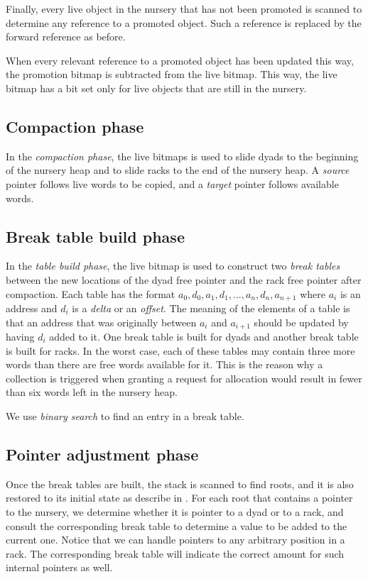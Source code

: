 Finally, every live object in the nursery that has not been promoted
is scanned to determine any reference to a promoted object.  Such a
reference is replaced by the forward reference as before.

When every relevant reference to a promoted object has been updated
this way, the promotion bitmap is subtracted from the live
bitmap.  This way, the live bitmap has a bit set only for live
objects that are still in the nursery.

\subsection{Compaction phase}

In the \emph{compaction phase}, the live bitmaps is used to slide
dyads to the beginning of the nursery heap and to slide racks to the
end of the nursery heap.  A \emph{source} pointer follows live words
to be copied, and a \emph{target} pointer follows available words.

\subsection{Break table build phase}
\label{sec-garbage-collection-break-table-build-phase}

In the \emph{table build phase}, the live bitmap is used to construct
two \emph{break tables} between the new locations of the dyad free
pointer and the rack free pointer after compaction.  Each table has
the format $a_0, d_0, a_1, d_1, \ldots, a_n, d_n, a_{n+1}$ where $a_i$
is an address and $d_i$ is a \emph{delta} or an \emph{offset}.  The
meaning of the elements of a table is that an address that was
originally between $a_i$ and $a_{i+1}$ should be updated by having
$d_i$ added to it.  One break table is built for dyads and another
break table is built for racks.  In the worst case, each of these
tables may contain three more words than there are free words
available for it.  This is the reason why a collection is triggered
when granting a request for allocation would result in fewer than six
words left in the nursery heap.

We use \emph{binary search} to find an entry in a break table.

\subsection{Pointer adjustment phase}

Once the break tables are built, the stack is scanned to find roots, and it
is also restored to its initial state as describe in
.  For each root that
contains a pointer to the nursery, we determine whether it is pointer
to a dyad or to a rack, and consult the corresponding break table to
determine a value to be added to the current one.  Notice that we can
handle pointers to any arbitrary position in a rack.  The
corresponding break table will indicate the correct amount for such
internal pointers as well.

